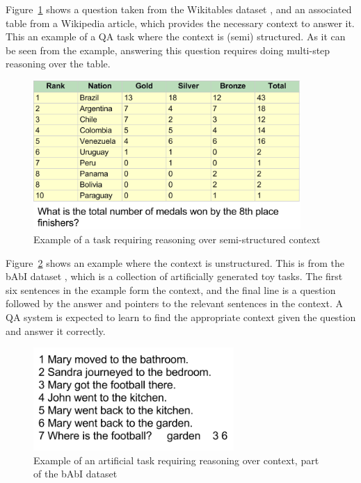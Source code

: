 Figure~\ref{fig:wikitables_example} shows a question taken from the Wikitables dataset \citep{pasupat2015compositional}, and an associated table from a Wikipedia article,
which provides the necessary context to answer it. This an example of a QA task where the context is (semi) structured. As it can be seen from the example, answering this
question requires doing multi-step reasoning over the table.
\begin{figure}
\begin{center}
\includegraphics[width=4in]{figures/wikitables_example.png}
\caption{Example of a task requiring reasoning over semi-structured context}
\label{fig:wikitables_example}
\end{center}
\end{figure}

Figure~\ref{fig:babi_example} shows an example where the context is unstructured. This is from the bAbI dataset \citep{weston2015towards}, which is a collection of artificially generated toy tasks.
The first six sentences in the example
form the context, and the final line is a question followed by the answer and pointers to the relevant sentences in the context. A QA system is expected to learn to find the appropriate context
given the question and answer it correctly.
\begin{figure}
\begin{center}
\includegraphics[width=3in]{figures/bAbI_example.png}
\caption{Example of an artificial task requiring reasoning over context, part of the bAbI dataset}
\label{fig:babi_example}
\end{center}
\end{figure}

